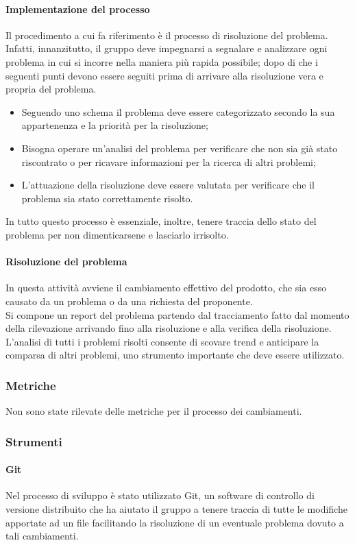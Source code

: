 \paragraph{Implementazione del processo}
Il procedimento a cui fa riferimento è il processo di risoluzione del problema.
Infatti, innanzitutto, il gruppo deve impegnarsi a segnalare e analizzare ogni problema in cui si incorre nella maniera più rapida possibile; dopo di che i seguenti punti devono essere seguiti prima di arrivare alla risoluzione vera e propria del problema.
\begin{itemize}
    \item Seguendo uno schema il problema deve essere categorizzato secondo la sua appartenenza e la priorità per la risoluzione;
    \item Bisogna operare un'analisi del problema per verificare che non sia già stato riscontrato o per ricavare informazioni per la ricerca di altri problemi;
    \item L'attuazione della risoluzione deve essere valutata per verificare che il problema sia stato correttamente risolto.
\end{itemize}
In tutto questo processo è essenziale, inoltre, tenere traccia dello stato del problema per non dimenticarsene e lasciarlo irrisolto.
\paragraph{Risoluzione del problema}
In questa attività avviene il cambiamento effettivo del prodotto, che sia esso causato da un problema o da una richiesta del proponente.\\
Si compone un report del problema partendo dal tracciamento fatto dal momento della rilevazione arrivando fino alla risoluzione e alla verifica della risoluzione.\\
L'analisi di tutti i problemi risolti consente di scovare trend e anticipare la comparsa di altri problemi, uno strumento importante che deve essere utilizzato.
\subsubsection{Metriche}
Non sono state rilevate delle metriche per il processo dei cambiamenti.
\subsubsection{Strumenti}
\paragraph{Git}
Nel processo di sviluppo è stato utilizzato Git, un software di controllo di versione distribuito che ha aiutato il gruppo \Gruppo{} a tenere traccia di tutte le modifiche apportate ad un file facilitando la risoluzione di un eventuale problema dovuto a tali cambiamenti.